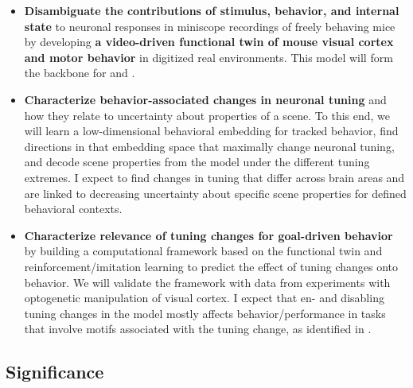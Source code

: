 \documentclass[COG,11pt]{ercgrant}
\begin{document}
\begin{itemize}[leftmargin=2em,topsep=0pt,itemsep=0.62ex,partopsep=0ex,parsep=0.5ex,rightmargin=1ex]
    \item[\obj{1}] \textbf{Disambiguate the contributions of stimulus, behavior, and internal state} to neuronal responses in miniscope recordings of freely behaving mice  by developing \textbf{a video-driven functional twin of mouse visual cortex and motor behavior} in digitized real environments. This model will form the backbone for  and . 
    \item[\obj{2}] \textbf{Characterize behavior-associated changes in neuronal tuning} and how they relate to
    uncertainty about properties of a scene. To this end, we will learn a low-dimensional behavioral embedding for tracked behavior, find directions in that embedding space that maximally change neuronal tuning, and decode scene properties from the model under the different tuning extremes. I expect to find changes in tuning that differ across brain areas and are linked to decreasing  uncertainty about specific scene properties for defined behavioral contexts. 
    \item[\obj{3}] \textbf{Characterize relevance of tuning changes for goal-driven behavior} by building a computational framework based on the functional twin and reinforcement/imitation learning to predict the effect of tuning changes onto behavior. We will validate the framework with data from experiments with optogenetic manipulation of visual cortex. I expect that en- and disabling tuning changes in the model mostly affects behavior/performance in tasks that involve motifs associated with the tuning change, as identified in .
\end{itemize}

\subsection{Significance}
\end{document}
